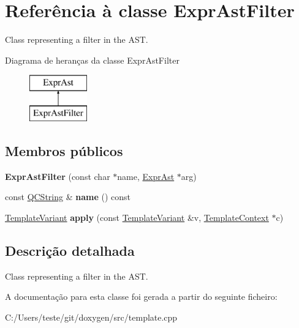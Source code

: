 \hypertarget{class_expr_ast_filter}{\section{Referência à classe Expr\-Ast\-Filter}
\label{class_expr_ast_filter}
}


Class representing a filter in the A\-S\-T.  


Diagrama de heranças da classe Expr\-Ast\-Filter\begin{figure}[H]
\begin{center}
\leavevmode
\includegraphics[height=2.000000cm]{class_expr_ast_filter}
\end{center}
\end{figure}
\subsection*{Membros públicos}
\begin{DoxyCompactItemize}
\item 
\hypertarget{class_expr_ast_filter_a72151f54b91547927aa73d83aa647780}{{\bfseries Expr\-Ast\-Filter} (const char $\ast$name, \hyperlink{class_expr_ast}{Expr\-Ast} $\ast$arg)}\label{class_expr_ast_filter_a72151f54b91547927aa73d83aa647780}

\item 
\hypertarget{class_expr_ast_filter_a2c310e06c9aadc6fb218f80fcbb5c695}{const \hyperlink{class_q_c_string}{Q\-C\-String} \& {\bfseries name} () const }\label{class_expr_ast_filter_a2c310e06c9aadc6fb218f80fcbb5c695}

\item 
\hypertarget{class_expr_ast_filter_acd47ec0b5a544470c6ea6fdff72cadcc}{\hyperlink{class_template_variant}{Template\-Variant} {\bfseries apply} (const \hyperlink{class_template_variant}{Template\-Variant} \&v, \hyperlink{class_template_context}{Template\-Context} $\ast$c)}\label{class_expr_ast_filter_acd47ec0b5a544470c6ea6fdff72cadcc}

\end{DoxyCompactItemize}


\subsection{Descrição detalhada}
Class representing a filter in the A\-S\-T. 

A documentação para esta classe foi gerada a partir do seguinte ficheiro\-:\begin{DoxyCompactItemize}
\item 
C\-:/\-Users/teste/git/doxygen/src/template.\-cpp\end{DoxyCompactItemize}
